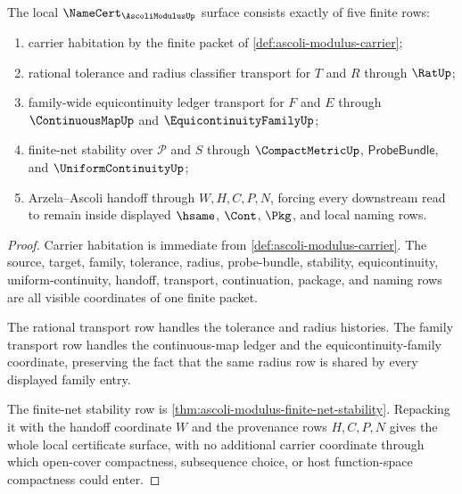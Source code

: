 \begin{theorem}
\label{thm:ascoli-modulus-namecert-obligations}
The local $\NameCert_{\AscoliModulusUp}$ surface consists exactly of five finite rows:
\begin{enumerate}
\item carrier habitation by the finite packet of \autoref{def:ascoli-modulus-carrier};
\item rational tolerance and radius classifier transport for $T$ and $R$ through $\RatUp$;
\item family-wide equicontinuity ledger transport for $F$ and $E$ through $\ContinuousMapUp$ and $\EquicontinuityFamilyUp$;
\item finite-net stability over $\mathcal{P}$ and $S$ through $\CompactMetricUp$, $\mathsf{ProbeBundle}$, and $\UniformContinuityUp$;
\item Arzela--Ascoli handoff through $W,H,C,P,N$, forcing every downstream read to remain inside displayed $\hsame$, $\Cont$, $\Pkg$, and local naming rows.
\end{enumerate}
\end{theorem}
\begin{proof}
Carrier habitation is immediate from \autoref{def:ascoli-modulus-carrier}. The source, target, family, tolerance, radius, probe-bundle, stability, equicontinuity, uniform-continuity, handoff, transport, continuation, package, and naming rows are all visible coordinates of one finite packet.

The rational transport row handles the tolerance and radius histories. The family transport row handles the continuous-map ledger and the equicontinuity-family coordinate, preserving the fact that the same radius row is shared by every displayed family entry.

The finite-net stability row is \autoref{thm:ascoli-modulus-finite-net-stability}. Repacking it with the handoff coordinate $W$ and the provenance rows $H,C,P,N$ gives the whole local certificate surface, with no additional carrier coordinate through which open-cover compactness, subsequence choice, or host function-space compactness could enter.
\end{proof}

